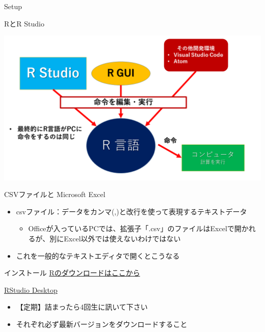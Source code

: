 \documentclass[
  ignorenonframetext,
]{beamer}
\providecommand{\tightlist}{%
  \setlength{\itemsep}{0pt}\setlength{\parskip}{0pt}}
\begin{document}
\begin{frame}[fragile]{Setup}
\begin{block}{RとR Studio}
\protect\hypertarget{rux3068r-studio}{}
\begin{center}\includegraphics[width=0.95\linewidth]{figs/r_structure} \end{center}
\end{block}

\begin{block}{CSVファイルと Microsoft Excel}
\protect\hypertarget{csvux30d5ux30a1ux30a4ux30ebux3068-microsoft-excel}{}
\begin{itemize}
\tightlist
\item
  csvファイル：データをカンマ(,)と改行を使って表現するテキストデータ

  \begin{itemize}
  \tightlist
  \item
    Officeが入っているPCでは、拡張子「.csv」のファイルはExcelで開かれるが、別にExcel以外では使えないわけではない
  \end{itemize}
\item
  これを一般的なテキストエディタで開くとこうなる
\end{itemize}
\end{block}

\begin{block}{インストール}
\protect\hypertarget{ux30a4ux30f3ux30b9ux30c8ux30fcux30eb}{}
\href{https://cran.ism.ac.jp/}{Rのダウンロードはここから}

\href{https://www.rstudio.com/products/rstudio/download/\#download}{RStudio
Desktop}

\begin{itemize}
\tightlist
\item
  【定期】詰まったら4回生に訊いて下さい
\item
  それぞれ必ず最新バージョンをダウンロードすること


\end{itemize}
\end{block}
\end{frame}
\end{document}
